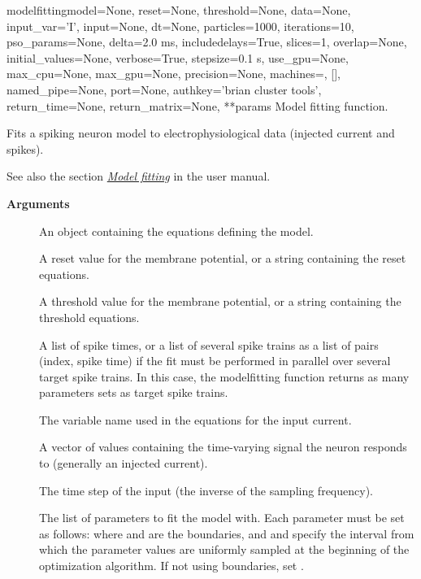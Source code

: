 \documentclass[letterpaper,10pt,english]{manual}
\begin{document}
\hypertarget{brian.library.modelfitting.modelfitting}{}\begin{funcdesc}{modelfitting}{model=None, reset=None, threshold=None, data=None, input\_var='I', input=None, dt=None, particles=1000, iterations=10, pso\_params=None, delta=2.0 ms, includedelays=True, slices=1, overlap=None, initial\_values=None, verbose=True, stepsize=0.1 s, use\_gpu=None, max\_cpu=None, max\_gpu=None, precision=None, machines=, {[}{]}, named\_pipe=None, port=None, authkey='brian cluster tools', return\_time=None, return\_matrix=None, **params}
Model fitting function.

Fits a spiking neuron model to electrophysiological data (injected current and spikes).

See also the section \hyperlink{model-fitting-library}{\emph{Model fitting}} in the user manual.

\textbf{Arguments}
\begin{description}
\item[] \leavevmode
An \hyperlink{brian.Equations}{} object containing the equations defining the model.

\item[] \leavevmode
A reset value for the membrane potential, or a string containing the reset
equations.

\item[] \leavevmode
A threshold value for the membrane potential, or a string containing the threshold
equations.

\item[] \leavevmode
A list of spike times, or a list of several spike trains as a list of pairs (index, spike time)
if the fit must be performed in parallel over several target spike trains. In this case,
the modelfitting function returns as many parameters sets as target spike trains.

\item[] \leavevmode
The variable name used in the equations for the input current.

\item[] \leavevmode
A vector of values containing the time-varying signal the neuron responds to (generally
an injected current).

\item[] \leavevmode
The time step of the input (the inverse of the sampling frequency).

\item[] \leavevmode
The list of parameters to fit the model with. Each parameter must be set as follows:
where  and  are the boundaries, and  and 
specify the interval from which the parameter values are uniformly sampled at
the beginning of the optimization algorithm.
If not using boundaries, set .


\end{description}
\end{funcdesc}
\end{document}
